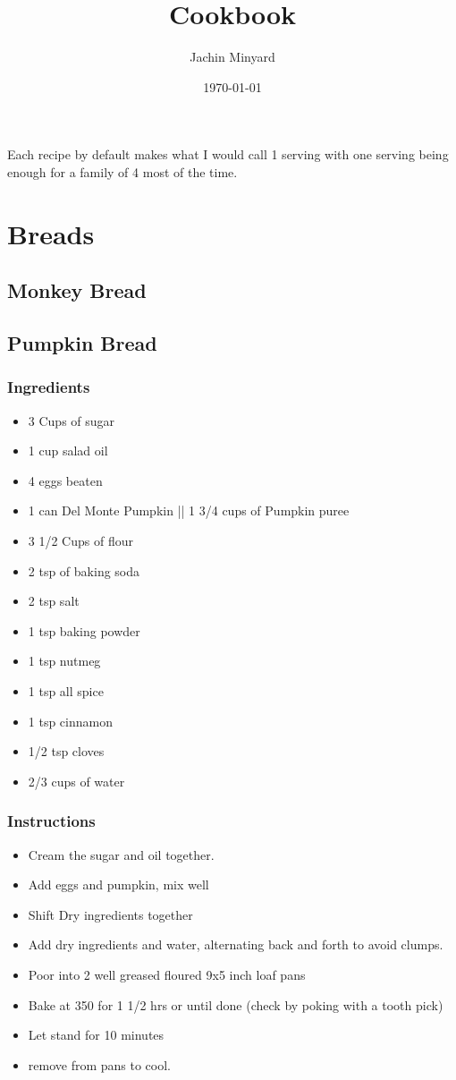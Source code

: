 \documentclass[11pt]{article}
\author{Jachin Minyard}
\date{\today}
\title{Cookbook}
\begin{document}
\maketitle

Each recipe by default makes what I would call 1 serving with one serving being enough for a family of 4 most of the time.
\section{Breads}
\label{sec:org6c9835c}
\subsection{Monkey Bread}
\label{sec:org6a017b2}
\subsection{Pumpkin Bread}
\label{sec:org371571b}
\subsubsection*{Ingredients}
\label{sec:org50e2db3}
\begin{itemize}
\item 3 Cups of sugar
\item 1 cup salad oil
\item 4 eggs beaten
\item 1 can Del Monte Pumpkin || 1 3/4 cups of Pumpkin puree
\item 3 1/2 Cups of flour
\item 2 tsp of baking soda
\item 2 tsp salt
\item 1 tsp baking powder
\item 1 tsp nutmeg
\item 1 tsp all spice
\item 1 tsp cinnamon
\item 1/2 tsp cloves
\item 2/3 cups of water
\end{itemize}
\subsubsection*{Instructions}
\label{sec:orgb780c37}
\begin{itemize}
\item Cream the sugar and oil together.
\item Add eggs and pumpkin, mix well
\item Shift Dry ingredients together
\item Add dry ingredients and water, alternating back and forth to avoid clumps.
\item Poor into 2 well greased floured 9x5 inch loaf pans
\item Bake at 350 \degree for 1 1/2 hrs or until done (check by poking with a tooth pick)
\item Let stand for 10 minutes
\item remove from pans to cool.
\end{itemize}
\end{document}

